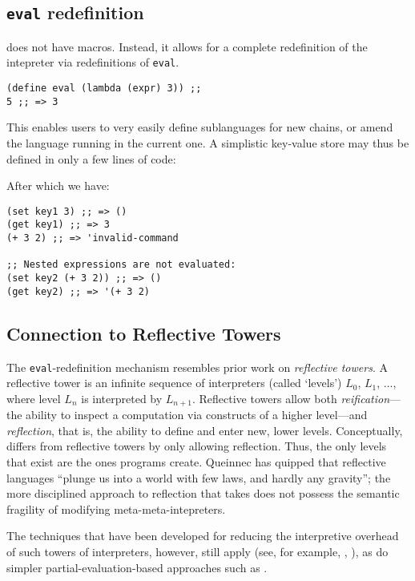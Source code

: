 
\subsection{\texttt{eval} redefinition}

\rad does not have macros. Instead, it allows for a complete redefinition of
the intepreter via redefinitions of \texttt{eval}.

\begin{verbatim}
(define eval (lambda (expr) 3)) ;;
5 ;; => 3
\end{verbatim}

This enables users to very easily define sublanguages for new chains, or amend
the language running in the current one. A simplistic key-value store may thus
be defined in only a few lines of code:



After which we have:

\begin{verbatim}
(set key1 3) ;; => ()
(get key1) ;; => 3
(+ 3 2) ;; => 'invalid-command

;; Nested expressions are not evaluated:
(set key2 (+ 3 2)) ;; => ()
(get key2) ;; => '(+ 3 2)
\end{verbatim}

\subsection{Connection to Reflective Towers}
\label{s:reflective-towers}

The \texttt{eval}-redefinition
mechanism resembles prior work on \emph{reflective towers}. A reflective
tower is an infinite sequence of interpreters (called `levels') $L_0$, $L_1$, ..., where
level $L_n$ is interpreted by $L_{n+1}$. Reflective towers allow both
\emph{reification}---the ability to inspect a computation via constructs of a
higher level---and \emph{reflection}, that is, the ability to define and enter new,
lower levels. Conceptually, \rad differs from reflective towers by only
allowing reflection. Thus, the only levels that exist are the ones programs
create. Queinnec has quipped that reflective languages ``plunge us into a world
with few laws, and hardly any gravity''\cite{Queinnec1994}; the more disciplined approach to
reflection that \rad takes does not possess the semantic fragility of modifying
meta-meta-intepreters.

The techniques that have been developed for reducing the interpretive overhead
of such towers of interpreters, however, still
apply (see, for example, \cite{Amin2017}, \cite{Asai2014}), as do simpler
partial-evaluation-based approaches such as \cite{Brown2017}.



